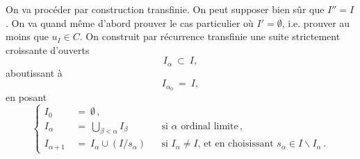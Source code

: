On va procéder par construction transfinie. On peut supposer bien sûr que $I'' = I$. On va quand même d'abord prouver le cas particulier où $I' = \emptyset$, i.e. prouver au moins que $u_I \in C$. On construit par récurrence transfinie une suite strictement croissante d'ouverts
\[
I_{\alpha} \ \subset \ I,
\]
aboutissant à
\[
I_{\alpha_0} \ = \ I,
\]
en posant
\[
\left\{
\begin{aligned}
I_0 \ &= \ \emptyset\,, \\
I_{\alpha} \ &= \ \textstyle\bigcup_{\beta < \alpha} I_{\beta} && \text{si $\alpha$ ordinal limite}\,, \\
I_{\alpha+1} \ &= \ I_{\alpha} \cup (I/s_{\alpha}) && \text{si $I_{\alpha} \neq I$, et en choisissant $s_{\alpha} \in I \backslash I_{\alpha}$}\,.
\end{aligned}
\right.
\]



